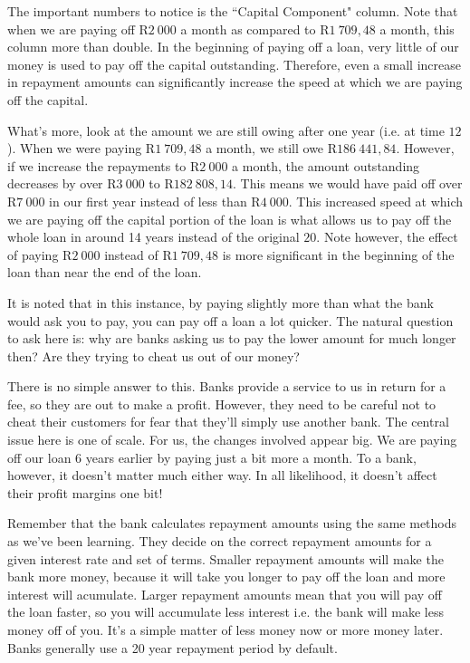 The important numbers to notice is the ``Capital Component" column. Note that when we are paying off R$2~000$ a month as compared to R$1~709,48$ a month, this column more than double. In the beginning of paying off a loan, very little of our money is used to pay off the capital outstanding. Therefore, even a small increase in repayment amounts can significantly increase the speed at which we are paying off the capital.

What's more, look at the amount we are still owing after one year (i.e. at time $12$). When we were paying R$1~709,48$ a month, we still owe R$186~441,84$. However, if we increase the repayments to R$2~000$ a month, the amount outstanding decreases by over R$3~000$ to R$182~808,14$. This means we would have paid off over R$7~000$ in our first year instead of less than R$4~000$. This increased speed at which we are paying off the capital portion of the loan is what allows us to pay off the whole loan in around 14 years instead of the original $20$. Note however, the effect of paying R$2~000$ instead of R$1~709,48$ is more significant in the beginning of the loan than near the end of the loan.

It is noted that in this instance, by paying slightly more than what the bank would ask you to pay, you can pay off a loan a lot quicker. The natural question to ask here is: why are banks asking us to pay the lower amount for much longer then? Are they trying to cheat us out of our money?

There is no simple answer to this. Banks provide a service to us in return for a fee, so they are out to make a profit. However, they need to be careful not to cheat their customers for fear that they'll simply use another bank. The central issue here is one of scale. For us, the changes involved appear big. We are paying off our loan 6 years earlier by paying just a bit more a month. To a bank, however, it doesn't matter much either way. In all likelihood, it doesn't affect their profit margins one bit!

Remember that the bank calculates repayment amounts using the same methods as we've been learning. They decide on the correct repayment amounts for a given interest rate and set of terms. Smaller repayment amounts will make the bank more money, because it will take you longer to pay off the loan and more interest will acumulate. Larger repayment amounts mean that you will pay off the loan faster, so you will accumulate less interest i.e. the bank will make less money off of you. It's a simple matter of less money now or more money later. Banks generally use a 20 year repayment period by default.

